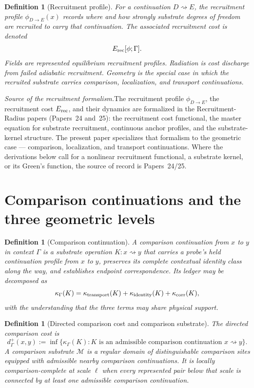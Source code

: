 \documentclass[11pt]{article}
\newtheorem{definition}[theorem]{Definition}
\theoremstyle{remark}
\newcommand{\G}{\Gamma}
\newcommand{\goes}{\rightsquigarrow}
\newcommand{\Cost}{\kappa}
\newcommand{\Erec}{E_{\rm rec}}
\newcommand{\phide}{\phi_{D\to E}}
\newcommand{\Mgeom}{\mathcal M}
\begin{document}
\begin{definition}[Recruitment profile]
For a continuation \(D\goes E\), the recruitment profile \(\phide(x)\) records where and how strongly substrate degrees of freedom are recruited to carry that continuation.  The associated recruitment cost is denoted
\[
        \Erec[\phi;\G].
\]
Fields are represented equilibrium recruitment profiles.  Radiation is cost discharge from failed adiabatic recruitment.  Geometry is the special case in which the recruited substrate carries comparison, localization, and transport continuations.
\end{definition}

\noindent\textit{Source of the recruitment formalism.}\quad The recruitment profile $\phide$, the recruitment cost $\Erec$, and their dynamics are formalized in the Recruitment-Radius papers (Papers~24 and~25): the recruitment cost functional, the master equation for substrate recruitment, continuous anchor profiles, and the substrate-kernel structure.  The present paper specializes that formalism to the geometric case --- comparison, localization, and transport continuations.  Where the derivations below call for a nonlinear recruitment functional, a substrate kernel, or its Green's function, the source of record is Papers~24/25.

\section{Comparison continuations and the three geometric levels}
\label{sec:three-geometries}

\begin{definition}[Comparison continuation]
A comparison continuation from $x$ to $y$ in context $\G$ is a substrate operation $K:x\goes y$ that carries a probe's held continuation profile from $x$ to $y$, preserves its complete contextual identity class along the way, and establishes endpoint correspondence.  Its ledger may be decomposed as
\[
\Cost_\G(K)
=
\Cost_{\rm transport}(K)
+
\Cost_{\rm identity}(K)
+
\Cost_{\rm corr}(K),
\]
with the understanding that the three terms may share physical support.
\end{definition}

\begin{definition}[Directed comparison cost and comparison substrate]
The directed comparison cost is
\[
        d^+_\G(x,y)
        :=
        \inf\{\Cost_\G(K):K\text{ is an admissible comparison continuation }x\goes y\}.
\]
A comparison substrate $\Mgeom$ is a regular domain of distinguishable comparison sites equipped with admissible nearby comparison continuations.  It is locally comparison-complete at scale $\ell$ when every represented pair below that scale is connected by at least one admissible comparison continuation.
\end{definition}
\end{document}
